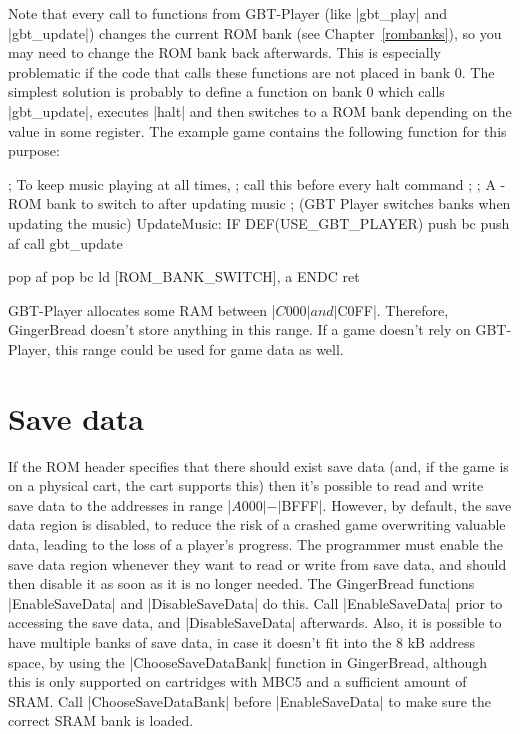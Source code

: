 \documentclass[11pt]{book}
\begin{document}
Note that every call to functions from GBT-Player (like |gbt_play| and |gbt_update|) changes the current ROM bank (see Chapter~\ref{rombanks}), so you may need to change the ROM bank back afterwards. This is especially problematic if the code that calls these functions are not placed in bank 0. The simplest solution is probably to define a function on bank 0 which calls |gbt_update|, executes |halt| and then switches to a ROM bank depending on the value in some register. The example game contains the following function for this purpose:

\begin{code}
; To keep music playing at all times,
; call this before every halt command
; 
; A - ROM bank to switch to after updating music 
; (GBT Player switches banks when updating the music)    
UpdateMusic:
IF DEF(USE_GBT_PLAYER)
    push bc
    push af
    call gbt_update
    
    pop af
    pop bc
    ld [ROM_BANK_SWITCH], a
ENDC
    ret 
\end{code}

GBT-Player allocates some RAM between |$C000| and |$C0FF|. Therefore, GingerBread doesn't store anything in this range. If a game doesn't rely on GBT-Player, this range could be used for game data as well.

\section{Save data}
\label{savedata}
If the ROM header specifies that there should exist save data (and, if the game is on a physical cart, the cart supports this) then it's possible to read and write save data to the addresses in range |$A000|-|$BFFF|. However, by default, the save data region is disabled, to reduce the risk of a crashed game overwriting valuable data, leading to the loss of a player's progress. The programmer must enable the save data region whenever they want to read or write from save data, and should then disable it as soon as it is no longer needed. The GingerBread functions |EnableSaveData| and |DisableSaveData| do this. Call |EnableSaveData| prior to accessing the save data, and |DisableSaveData| afterwards. Also, it is possible to have multiple banks of save data, in case it doesn't fit into the 8 kB address space, by using the |ChooseSaveDataBank| function in GingerBread, although this is only supported on cartridges with MBC5 and a sufficient amount of SRAM. Call |ChooseSaveDataBank| before |EnableSaveData| to make sure the correct SRAM bank is loaded.
\end{document}
